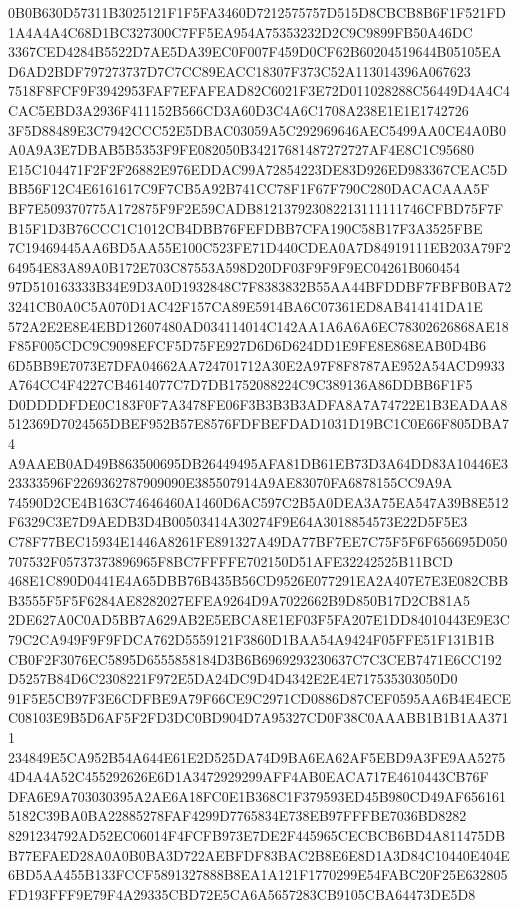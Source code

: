 \documentclass[UTF8,fontset=fandol,zihao=-4,a4paper]{ctexart}
\begin{document}
{{0B0B630D57311B3025121F1F5FA3460D7212575757D515D8CBCB8B6F1F521FD1A4A4A4C68D1BC327300C7FF5EA954A75353232D2C9C9899FB50A46DC
3367CED4284B5522D7AE5DA39EC0F007F459D0CF62B60204519644B05105EAD6AD2BDF797273737D7C7CC89EACC18307F373C52A113014396A067623
7518F8FCF9F3942953FAF7EFAFEAD82C6021F3E72D011028288C56449D4A4C4CAC5EBD3A2936F411152B566CD3A60D3C4A6C1708A238E1E1E1742726
3F5D88489E3C7942CCC52E5DBAC03059A5C292969646AEC5499AA0CE4A0B0A0A9A3E7DBAB5B5353F9FE082050B34217681487272727AF4E8C1C95680
E15C104471F2F2F26882E976EDDAC99A72854223DE83D926ED983367CEAC5DBB56F12C4E6161617C9F7CB5A92B741CC78F1F67F790C280DACACAAA5F
BF7E509370775A172875F9F2E59CADB812137923082213111111746CFBD75F7FB15F1D3B76CCC1C1012CB4DBB76FEFDBB7CFA190C58B17F3A3525FBE
7C19469445AA6BD5AA55E100C523FE71D440CDEA0A7D84919111EB203A79F264954E83A89A0B172E703C87553A598D20DF03F9F9F9EC04261B060454
97D510163333B34E9D3A0D1932848C7F8383832B55AA44BFDDBF7FBFB0BA723241CB0A0C5A070D1AC42F157CA89E5914BA6C07361ED8AB414141DA1E
572A2E2E8E4EBD12607480AD034114014C142AA1A6A6A6EC78302626868AE18F85F005CDC9C9098EFCF5D75FE927D6D6D624DD1E9FE8E868EAB0D4B6
6D5BB9E7073E7DFA04662AA724701712A30E2A97F8F8787AE952A54ACD9933A764CC4F4227CB4614077C7D7DB1752088224C9C389136A86DDBB6F1F5
D0DDDDFDE0C183F0F7A3478FE06F3B3B3B3ADFA8A7A74722E1B3EADAA8512369D7024565DBEF952B57E8576FDFBEFDAD1031D19BC1C0E66F805DBA74
A9AAEB0AD49B863500695DB26449495AFA81DB61EB73D3A64DD83A10446E323333596F2269362787909090E385507914A9AE83070FA6878155CC9A9A
74590D2CE4B163C74646460A1460D6AC597C2B5A0DEA3A75EA547A39B8E512F6329C3E7D9AEDB3D4B00503414A30274F9E64A3018854573E22D5F5E3
C78F77BEC15934E1446A8261FE891327A49DA77BF7EE7C75F5F6F656695D050707532F05737373896965F8BC7FFFFE702150D51AFE32242525B11BCD
468E1C890D0441E4A65DBB76B435B56CD9526E077291EA2A407E7E3E082CBBB3555F5F5F6284AE8282027EFEA9264D9A7022662B9D850B17D2CB81A5
2DE627A0C0AD5BB7A629AB2E5EBCA8E1EF03F5FA207E1DD84010443E9E3C79C2CA949F9F9FDCA762D5559121F3860D1BAA54A9424F05FFE51F131B1B
CB0F2F3076EC5895D6555858184D3B6B6969293230637C7C3CEB7471E6CC192D5257B84D6C2308221F972E5DA24DC9D4D4342E2E4E717535303050D0
91F5E5CB97F3E6CDFBE9A79F66CE9C2971CD0886D87CEF0595AA6B4E4ECEC08103E9B5D6AF5F2FD3DC0BD904D7A95327CD0F38C0AAABB1B1B1AA3711
234849E5CA952B54A644E61E2D525DA74D9BA6EA62AF5EBD9A3FE9AA52754D4A4A52C455292626E6D1A3472929299AFF4AB0EACA717E4610443CB76F
DFA6E9A703030395A2AE6A18FC0E1B368C1F379593ED45B980CD49AF6561615182C39BA0BA22885278FAF4299D7765834E738EB97FFFBE7036BD8282
8291234792AD52EC06014F4FCFB973E7DE2F445965CECBCB6BD4A811475DBB77EFAED28A0A0B0BA3D722AEBFDF83BAC2B8E6E8D1A3D84C10440E404E
6BD5AA455B133FCCF5891327888B8EA1A121F1770299E54FABC20F25E632805FD193FFF9E79F4A29335CBD72E5CA6A5657283CB9105CBA64473DE5D8
}}
\end{document}
